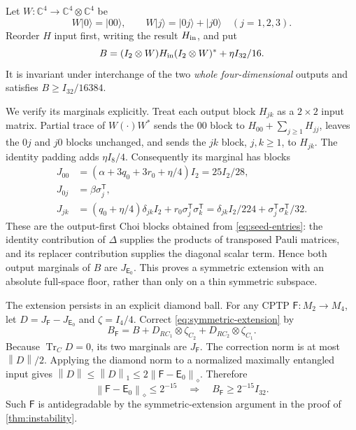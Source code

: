 \documentclass[11pt,reqno]{amsart}
\theoremstyle{definition}
\theoremstyle{remark}
\numberwithin{equation}{section}
\DeclareMathOperator{\Tr}{Tr}
\newcommand{\E}{\mathsf E}
\newcommand{\F}{\mathsf F}
\newcommand{\norm}[1]{\left\lVert#1\right\rVert}
\begin{document}
Let $W:\mathbb C^4\to\mathbb C^4\otimes\mathbb C^4$ be
\[
 W|0\rangle=|00\rangle,\qquad
 W|j\rangle=|0j\rangle+|j0\rangle\quad(j=1,2,3).
\]
Reorder $H$ input first, writing the result $H_{\rm in}$, and put
\begin{equation}\label{eq:symmetric-extension}
 B=(I_2\otimes W)H_{\rm in}(I_2\otimes W)^*+\eta I_{32}/16.
\end{equation}
It is invariant under interchange of the two \emph{whole four-dimensional} outputs and satisfies $B\ge I_{32}/16384$.

We verify its marginals explicitly. Treat each output block $H_{jk}$ as a $2\times2$ input matrix. Partial trace of $W(\cdot)W^*$ sends the $00$ block to $H_{00}+\sum_{j\ge1}H_{jj}$, leaves the $0j$ and $j0$ blocks unchanged, and sends the $jk$ block, $j,k\ge1$, to $H_{jk}$. The identity padding adds $\eta I_8/4$. Consequently its marginal has blocks
\begin{align*}
 J_{00}&=(\alpha+3q_0+3r_0+\eta/4)I_2=25I_2/28,\\
 J_{0j}&=\beta\sigma_j^{\mathsf T},\\
 J_{jk}&=(q_0+\eta/4)\delta_{jk}I_2
              +r_0\sigma_j^{\mathsf T}\sigma_k^{\mathsf T}
       =\delta_{jk}I_2/224+\sigma_j^{\mathsf T}\sigma_k^{\mathsf T}/32.
\end{align*}
These are the output-first Choi blocks obtained from \eqref{eq:seed-entries}: the identity contribution of $\Delta$ supplies the products of transposed Pauli matrices, and its replacer contribution supplies the diagonal scalar term. Hence both output marginals of $B$ are $J_{\E_0}$. This proves a symmetric extension with an absolute full-space floor, rather than only on a thin symmetric subspace.

The extension persists in an explicit diamond ball. For any CPTP $\F:M_2\to M_4$, let $D=J_\F-J_{\E_0}$ and $\zeta=I_4/4$. Correct \eqref{eq:symmetric-extension} by
\[
 B_\F=B+D_{RC_1}\otimes\zeta_{C_2}+D_{RC_2}\otimes\zeta_{C_1}.
\]
Because $\Tr_C D=0$, its two marginals are $J_\F$. The correction norm is at most $\norm D/2$. Applying the diamond norm to a normalized maximally entangled input gives $\norm D\le\norm D_1\le2\norm{\F-\E_0}_\diamond$. Therefore
\begin{equation}\label{eq:antidegradable-ball}
 \norm{\F-\E_0}_\diamond\le2^{-15}
 \quad\Longrightarrow\quad B_\F\ge2^{-15}I_{32}.
\end{equation}
Such $\F$ is antidegradable by the symmetric-extension argument in the proof of \cref{thm:instability}.
\end{document}
